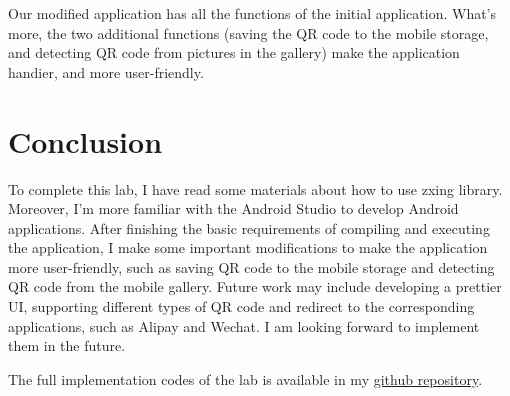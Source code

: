 \documentclass[12pt, a4paper]{article}
\theoremstyle{definition}
\begin{document}
Our modified application has all the functions of the initial application. What's more, the two additional functions (saving the QR code to the mobile storage, and detecting QR code from pictures in the gallery) make the application handier, and more user-friendly. 

\section{Conclusion}
To complete this lab, I have read some materials about how to use zxing library. Moreover, I'm more familiar with the Android Studio to develop Android applications. After finishing the basic requirements of compiling and executing the application, I make some important modifications to make the application more user-friendly, such as saving QR code to the mobile storage and detecting QR code from the mobile gallery. Future work may include developing a prettier UI, supporting different types of QR code and redirect to the corresponding applications, such as Alipay and Wechat. I am looking forward to implement them in the future.

The full implementation codes of the lab is available in my \href{https://github.com/Galaxies99/EE447-CourseData/tree/main/Labs/Lab2}{github repository}.

\end{document}
